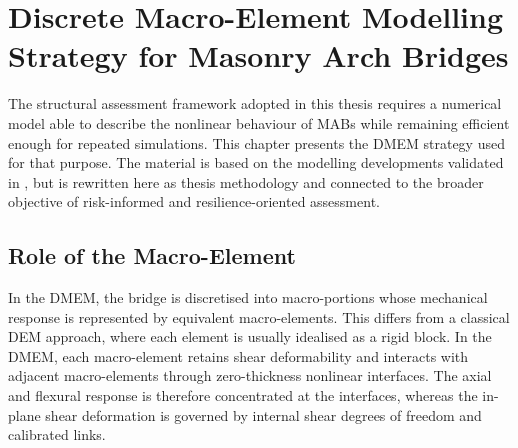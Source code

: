 


\chapter{Discrete Macro-Element Modelling Strategy for Masonry Arch Bridges}
\label{cha:dmem-strategy}

The structural assessment framework adopted in this thesis requires a numerical model able to describe the nonlinear behaviour of \gls{MAB}s while remaining efficient enough for repeated simulations. This chapter presents the \gls{DMEM} strategy used for that purpose. The material is based on the modelling developments validated in \cite{Bonatte2026DMEM}, but is rewritten here as thesis methodology and connected to the broader objective of risk-informed and resilience-oriented assessment.

\section{Role of the Macro-Element}
\label{sec:dmem-macro-element}

In the \gls{DMEM}, the bridge is discretised into macro-portions whose mechanical response is represented by equivalent macro-elements. This differs from a classical \gls{DEM} approach, where each element is usually idealised as a rigid block. In the \gls{DMEM}, each macro-element retains shear deformability and interacts with adjacent macro-elements through zero-thickness nonlinear interfaces. The axial and flexural response is therefore concentrated at the interfaces, whereas the in-plane shear deformation is governed by internal shear degrees of freedom and calibrated links.


